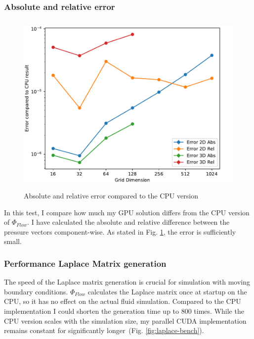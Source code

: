 \subsubsection{Absolute and relative error}
\begin{figure}[t]
\centering
	\includegraphics[height=9cm, width=14cm]{figures/error}
\caption{Absolute and relative error compared to the CPU version} \label{fig:error}
\end{figure}
In this test, I compare how much my GPU solution differs from the CPU version of $\Phi_{Flow}$. I have calculated the absolute and relative difference between the pressure vectors component-wise. As stated in Fig. \ref{fig:error}, the error is sufficiently small.

\clearpage
\subsubsection{Performance Laplace Matrix generation}
The speed of the Laplace matrix generation is crucial for simulation with moving boundary conditions. $\Phi_{Flow}$ calculates the Laplace matrix once at startup on the CPU, so it has no effect on the actual fluid simulation. Compared to the CPU implementation I could shorten the generation time up to 800 times.  While the CPU version scales with the simulation size, my parallel CUDA implementation remains constant for significantly longer (Fig. \ref{fig:laplace-bench}).

